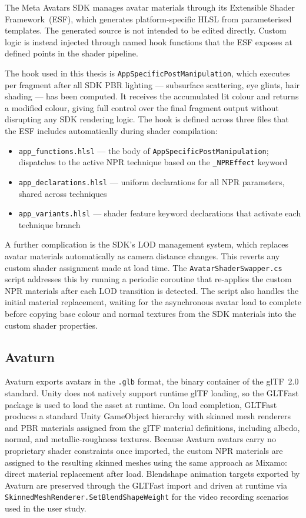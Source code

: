 The Meta Avatars SDK manages avatar materials through its Extensible Shader Framework~(ESF), which generates platform-specific HLSL from parameterised templates. The generated source is not intended to be edited directly. Custom logic is instead injected through named hook functions that the ESF exposes at defined points in the shader pipeline.

The hook used in this thesis is \texttt{AppSpecificPostManipulation}, which executes per fragment after all SDK PBR lighting — subsurface scattering, eye glints, hair shading — has been computed. It receives the accumulated lit colour and returns a modified colour, giving full control over the final fragment output without disrupting any SDK rendering logic. The hook is defined across three files that the ESF includes automatically during shader compilation:

\begin{itemize}
  \item \texttt{app\_functions.hlsl} — the body of \texttt{AppSpecificPostManipulation}; dispatches to the active NPR technique based on the \texttt{\_NPREffect} keyword
  \item \texttt{app\_declarations.hlsl} — uniform declarations for all NPR parameters, shared across techniques
  \item \texttt{app\_variants.hlsl} — shader feature keyword declarations that activate each technique branch
\end{itemize}

A further complication is the SDK's LOD management system, which replaces avatar materials automatically as camera distance changes. This reverts any custom shader assignment made at load time. The \texttt{AvatarShaderSwapper.cs} script addresses this by running a periodic coroutine that re-applies the custom NPR materials after each LOD transition is detected. The script also handles the initial material replacement, waiting for the asynchronous avatar load to complete before copying base colour and normal textures from the SDK materials into the custom shader properties.

\subsection{Avaturn}
\label{sec:impl_avaturn}

Avaturn exports avatars in the \texttt{.glb} format, the binary container of the glTF~2.0 standard. Unity does not natively support runtime glTF loading, so the GLTFast package is used to load the asset at runtime. On load completion, GLTFast produces a standard Unity GameObject hierarchy with skinned mesh renderers and PBR materials assigned from the glTF material definitions, including albedo, normal, and metallic-roughness textures. Because Avaturn avatars carry no proprietary shader constraints once imported, the custom NPR materials are assigned to the resulting skinned meshes using the same approach as Mixamo: direct material replacement after load. Blendshape animation targets exported by Avaturn are preserved through the GLTFast import and driven at runtime via \texttt{SkinnedMeshRenderer.SetBlendShapeWeight} for the video recording scenarios used in the user study.

